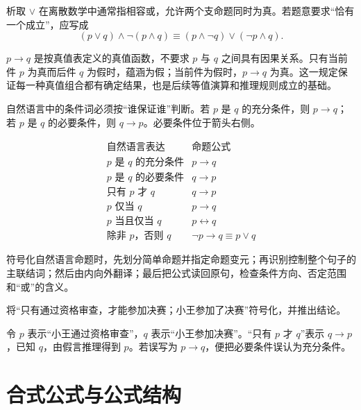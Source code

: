 析取 $\lor$ 在离散数学中通常指相容或，允许两个支命题同时为真。若题意要求“恰有一个成立”，应写成
\[
  (p\lor q)\land\neg(p\land q)
  \equiv (p\land\neg q)\lor(\neg p\land q).
\]

\begin{pitfall}[材料蕴涵的空真]\label{ch1-material-implication}
$p\to q$ 是按真值表定义的真值函数，不要求 $p$ 与 $q$ 之间具有因果关系。只有当前件 $p$ 为真而后件 $q$ 为假时，蕴涵为假；当前件为假时，$p\to q$ 为真。这一规定保证每一种真值组合都有确定结果，也是后续等值演算和推理规则成立的基础。
\end{pitfall}

自然语言中的条件词必须按“谁保证谁”判断。若 $p$ 是 $q$ 的充分条件，则 $p\to q$；若 $p$ 是 $q$ 的必要条件，则 $q\to p$。必要条件位于箭头右侧。

\[
\begin{array}{c|c}
\text{自然语言表达} & \text{命题公式}\\ \hline
p\text{ 是 }q\text{ 的充分条件} & p\to q\\
p\text{ 是 }q\text{ 的必要条件} & q\to p\\
\text{只有 }p\text{ 才 }q & q\to p\\
p\text{ 仅当 }q & p\to q\\
p\text{ 当且仅当 }q & p\leftrightarrow q\\
\text{除非 }p\text{，否则 }q & \neg p\to q\equiv p\lor q
\end{array}
\]

\begin{method}[命题符号化的基本步骤]\label{ch1-translation}
符号化自然语言命题时，先划分简单命题并指定命题变元；再识别控制整个句子的主联结词；然后由内向外翻译；最后把公式读回原句，检查条件方向、否定范围和“或”的含义。
\end{method}

\begin{example}[title={必要条件的判断}]\label{ch1-only-if}
将“只有通过资格审查，才能参加决赛；小王参加了决赛”符号化，并推出结论。
\begin{solution}
令 $p$ 表示“小王通过资格审查”，$q$ 表示“小王参加决赛”。“只有 $p$ 才 $q$”表示 $q\to p$，已知 $q$，由假言推理得到 $p$。若误写为 $p\to q$，便把必要条件误认为充分条件。
\end{solution}
\end{example}

\section{合式公式与公式结构}

